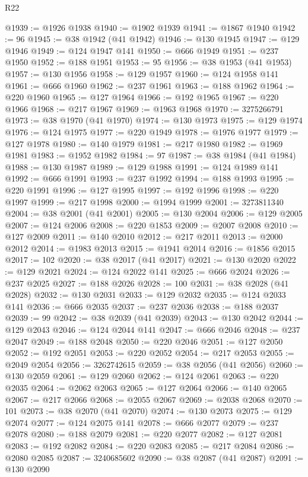 \begin{lexlean}{R22}
\begin{coremodule}
@1939 := @1926 @1938
@1940 := @1902 @1939
@1941 := @1867 @1940
@1942 := 96
@1945 := @38 @1942 (@41 @1942)
@1946 := @130 @1945
@1947 := @129 @1946
@1949 := @124 @1947 @141
@1950 := @666 @1949
@1951 := @237 @1950
@1952 := @188 @1951
@1953 := 95
@1956 := @38 @1953 (@41 @1953)
@1957 := @130 @1956
@1958 := @129 @1957
@1960 := @124 @1958 @141
@1961 := @666 @1960
@1962 := @237 @1961
@1963 := @188 @1962
@1964 := @220 @1960
@1965 := @127 @1964
@1966 := @192 @1965
@1967 := @220 @1966
@1968 := @217 @1967
@1969 := @1963 @1968
@1970 := 3275266791
@1973 := @38 @1970 (@41 @1970)
@1974 := @130 @1973
@1975 := @129 @1974
@1976 := @124 @1975
@1977 := @220 @1949
@1978 := @1976 @1977
@1979 := @127 @1978
@1980 := @140 @1979
@1981 := @217 @1980
@1982 := @1969 @1981
@1983 := @1952 @1982
@1984 := 97
@1987 := @38 @1984 (@41 @1984)
@1988 := @130 @1987
@1989 := @129 @1988
@1991 := @124 @1989 @141
@1992 := @666 @1991
@1993 := @237 @1992
@1994 := @188 @1993
@1995 := @220 @1991
@1996 := @127 @1995
@1997 := @192 @1996
@1998 := @220 @1997
@1999 := @217 @1998
@2000 := @1994 @1999
@2001 := 3273811340
@2004 := @38 @2001 (@41 @2001)
@2005 := @130 @2004
@2006 := @129 @2005
@2007 := @124 @2006
@2008 := @220 @1853
@2009 := @2007 @2008
@2010 := @127 @2009
@2011 := @140 @2010
@2012 := @217 @2011
@2013 := @2000 @2012
@2014 := @1983 @2013
@2015 := @1941 @2014
@2016 := @1856 @2015
@2017 := 102
@2020 := @38 @2017 (@41 @2017)
@2021 := @130 @2020
@2022 := @129 @2021
@2024 := @124 @2022 @141
@2025 := @666 @2024
@2026 := @237 @2025
@2027 := @188 @2026
@2028 := 100
@2031 := @38 @2028 (@41 @2028)
@2032 := @130 @2031
@2033 := @129 @2032
@2035 := @124 @2033 @141
@2036 := @666 @2035
@2037 := @237 @2036
@2038 := @188 @2037
@2039 := 99
@2042 := @38 @2039 (@41 @2039)
@2043 := @130 @2042
@2044 := @129 @2043
@2046 := @124 @2044 @141
@2047 := @666 @2046
@2048 := @237 @2047
@2049 := @188 @2048
@2050 := @220 @2046
@2051 := @127 @2050
@2052 := @192 @2051
@2053 := @220 @2052
@2054 := @217 @2053
@2055 := @2049 @2054
@2056 := 3262742615
@2059 := @38 @2056 (@41 @2056)
@2060 := @130 @2059
@2061 := @129 @2060
@2062 := @124 @2061
@2063 := @220 @2035
@2064 := @2062 @2063
@2065 := @127 @2064
@2066 := @140 @2065
@2067 := @217 @2066
@2068 := @2055 @2067
@2069 := @2038 @2068
@2070 := 101
@2073 := @38 @2070 (@41 @2070)
@2074 := @130 @2073
@2075 := @129 @2074
@2077 := @124 @2075 @141
@2078 := @666 @2077
@2079 := @237 @2078
@2080 := @188 @2079
@2081 := @220 @2077
@2082 := @127 @2081
@2083 := @192 @2082
@2084 := @220 @2083
@2085 := @217 @2084
@2086 := @2080 @2085
@2087 := 3240685602
@2090 := @38 @2087 (@41 @2087)
@2091 := @130 @2090

\end{coremodule}
\end{lexlean}
